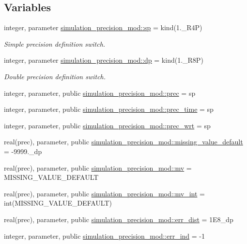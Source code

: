 \subsection*{Variables}
\begin{DoxyCompactItemize}
\item 
integer, parameter \hyperlink{namespacesimulation__precision__mod_a15b1ab993f9b11430e9d9d3dc6c77614}{simulation\+\_\+precision\+\_\+mod\+::sp} = kind(1.\+\_\+\+R4P)
\begin{DoxyCompactList}\small\item\em Simple precision definition switch. \end{DoxyCompactList}\item 
integer, parameter \hyperlink{namespacesimulation__precision__mod_a4d49b0033a5e2bc6693c5b2dfb63a032}{simulation\+\_\+precision\+\_\+mod\+::dp} = kind(1.\+\_\+\+R8P)
\begin{DoxyCompactList}\small\item\em Double precision definition switch. \end{DoxyCompactList}\item 
integer, parameter, public \hyperlink{namespacesimulation__precision__mod_aaff1ddf996761a1e11e787d63e1612f6}{simulation\+\_\+precision\+\_\+mod\+::prec} = sp
\item 
integer, parameter, public \hyperlink{namespacesimulation__precision__mod_a3833ad1bc52c3738ac861591b7492737}{simulation\+\_\+precision\+\_\+mod\+::prec\+\_\+time} = sp
\item 
integer, parameter, public \hyperlink{namespacesimulation__precision__mod_ad515822198607dfee68a6ed8b246c7da}{simulation\+\_\+precision\+\_\+mod\+::prec\+\_\+wrt} = sp
\item 
real(prec), parameter, public \hyperlink{namespacesimulation__precision__mod_a1fb0f91226452bb43d4c61cae32a9a6d}{simulation\+\_\+precision\+\_\+mod\+::missing\+\_\+value\+\_\+default} = -\/9999.\+\_\+dp
\item 
real(prec), parameter, public \hyperlink{namespacesimulation__precision__mod_a39845d8a0d331a7b9225feb5fe19ba3b}{simulation\+\_\+precision\+\_\+mod\+::mv} = M\+I\+S\+S\+I\+N\+G\+\_\+\+V\+A\+L\+U\+E\+\_\+\+D\+E\+F\+A\+U\+LT
\item 
real(prec), parameter, public \hyperlink{namespacesimulation__precision__mod_abcad51274c804cb573d8f5720c5dfa05}{simulation\+\_\+precision\+\_\+mod\+::mv\+\_\+int} = int(M\+I\+S\+S\+I\+N\+G\+\_\+\+V\+A\+L\+U\+E\+\_\+\+D\+E\+F\+A\+U\+LT)
\item 
real(prec), parameter, public \hyperlink{namespacesimulation__precision__mod_ae3222dd2d51f6b7221be1ca1c70e3e6c}{simulation\+\_\+precision\+\_\+mod\+::err\+\_\+dist} = 1\+E8\+\_\+dp
\item 
integer, parameter, public \hyperlink{namespacesimulation__precision__mod_a82a4b689dc26018c961193b991c489d4}{simulation\+\_\+precision\+\_\+mod\+::err\+\_\+ind} = -\/1
\end{DoxyCompactItemize}
